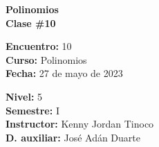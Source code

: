 \begin{center} \textbf
{
    \Large Polinomios \\ \vspace{2mm}Clase \#10
}
\end{center}

\begin{multicols}{2}
{
    \textbf{Encuentro:} 10\\
    \textbf{Curso:} Polinomios\\
    \textbf{Fecha:} 27 de mayo de 2023\\
    \begin{flushright}
        \textbf{Nivel:} 5\\
        \textbf{Semestre:} I\\
        \textbf{Instructor:} Kenny Jordan Tinoco\\
        \textbf{D. auxiliar: }José Adán Duarte
    \end{flushright}
}
\end{multicols}

\thispagestyle{first-page-style}